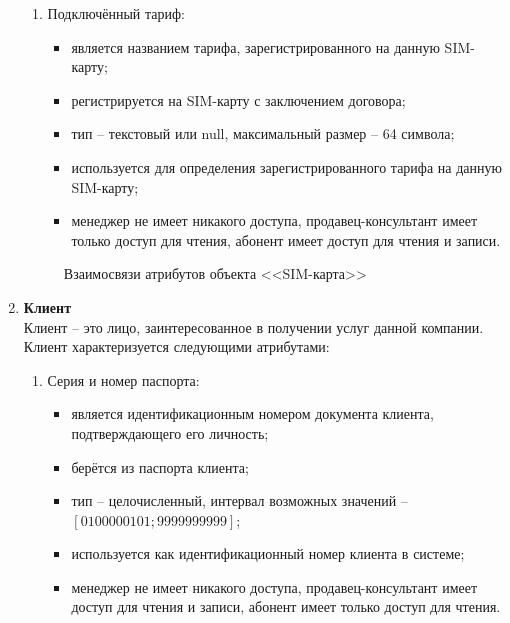 \begin{enumerate}
\begin{enumerate}
        \item Подключённый тариф:
        \begin{itemize}
            \item является названием тарифа, зарегистрированного на данную SIM-карту;
            \item регистрируется на SIM-карту с заключением договора;
            \item тип -- текстовый или null, максимальный размер -- 64 символа;
            \item используется для определения зарегистрированного тарифа на данную SIM-карту;
            \item менеджер не имеет никакого доступа, продавец-консультант имеет только доступ для чтения, абонент имеет доступ для чтения и записи.
        \end{itemize}
    \end{enumerate}
    \begin{figure}[H]
        \label{fig:sim-card-attributes}
        \caption{Взаимосвязи атрибутов объекта <<SIM-карта>>}
    \end{figure}

    \item \textbf{Клиент} \\
    Клиент -- это лицо, заинтересованное в получении услуг данной компании. Клиент характеризуется следующими атрибутами:
    \begin{enumerate}
        \item Серия и номер паспорта:
        \begin{itemize}
            \item является идентификационным номером документа клиента, подтверждающего его личность;
            \item берётся из паспорта клиента;
            \item тип -- целочисленный, интервал возможных значений -- $[0100000101; 9999999999]$;
            \item используется как идентификационный номер клиента в системе;
            \item менеджер не имеет никакого доступа, продавец-консультант имеет доступ для чтения и записи, абонент имеет только доступ для чтения.
        \end{itemize}


\end{enumerate}
\end{enumerate}
